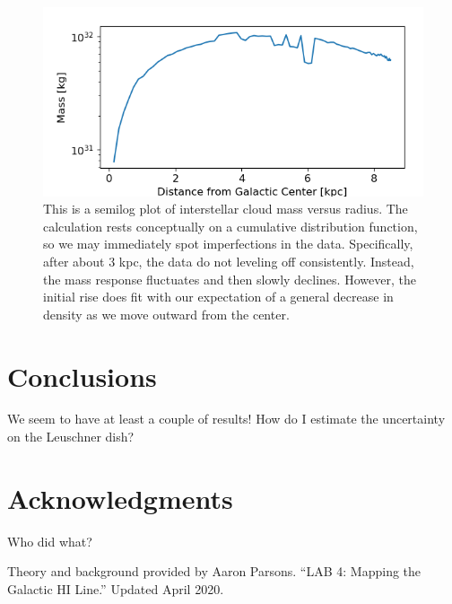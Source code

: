 \documentclass[12pt]{article}
\begin{document}
\begin{figure}
	\centering
	\includegraphics[width=.8\linewidth]{inner_mass_distro}
	\caption{This is a semilog plot of interstellar cloud mass versus radius. The calculation rests conceptually on a cumulative distribution function, so we may immediately spot imperfections in the data. Specifically, after about 3 kpc, the data do not leveling off consistently. Instead, the mass response fluctuates and then slowly declines. However, the initial rise does fit with our expectation of a general decrease in density as we move outward from the center.}
	\label{fig:inner_mass_distro}
\end{figure}

\section{Conclusions}

\quad \quad We seem to have at least a couple of results! How do I estimate the uncertainty on the Leuschner dish?

\section{Acknowledgments}

\quad \quad Who did what?

Theory and background provided by Aaron Parsons. ``LAB 4: Mapping the Galactic HI Line.'' Updated April 2020.

\end{document}
